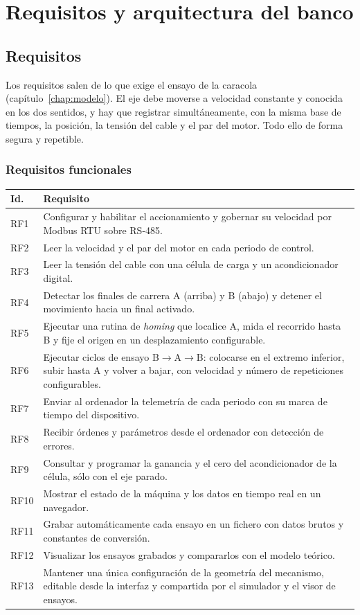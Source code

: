 \chapter{Requisitos y arquitectura del banco}
\label{chap:arquitectura}

\section{Requisitos}

Los requisitos salen de lo que exige el ensayo de la caracola (capítulo~\ref{chap:modelo}). El eje
debe moverse a velocidad constante y conocida en los dos sentidos, y hay que registrar
simultáneamente, con la misma base de tiempos, la posición, la tensión del cable y el par del motor.
Todo ello de forma segura y repetible.

\subsection{Requisitos funcionales}

\begin{longtable}{@{}L{0.09\textwidth}L{0.85\textwidth}@{}}
\toprule
\textbf{Id.} & \textbf{Requisito} \\
\midrule
\endhead
RF1 & Configurar y habilitar el accionamiento y gobernar su velocidad por Modbus RTU sobre RS-485. \\
RF2 & Leer la velocidad y el par del motor en cada periodo de control. \\
RF3 & Leer la tensión del cable con una célula de carga y un acondicionador digital. \\
RF4 & Detectar los finales de carrera A (arriba) y B (abajo) y detener el movimiento hacia un final activado. \\
RF5 & Ejecutar una rutina de \emph{homing} que localice A, mida el recorrido hasta B y fije el origen en un desplazamiento configurable. \\
RF6 & Ejecutar ciclos de ensayo B$\rightarrow$A$\rightarrow$B: colocarse en el extremo inferior, subir hasta A y volver a bajar, con velocidad y número de repeticiones configurables. \\
RF7 & Enviar al ordenador la telemetría de cada periodo con su marca de tiempo del dispositivo. \\
RF8 & Recibir órdenes y parámetros desde el ordenador con detección de errores. \\
RF9 & Consultar y programar la ganancia y el cero del acondicionador de la célula, sólo con el eje parado. \\
RF10 & Mostrar el estado de la máquina y los datos en tiempo real en un navegador. \\
RF11 & Grabar automáticamente cada ensayo en un fichero con datos brutos y constantes de conversión. \\
RF12 & Visualizar los ensayos grabados y compararlos con el modelo teórico. \\
RF13 & Mantener una única configuración de la geometría del mecanismo, editable desde la interfaz y compartida por el simulador y el visor de ensayos. \\
\bottomrule
\end{longtable}

